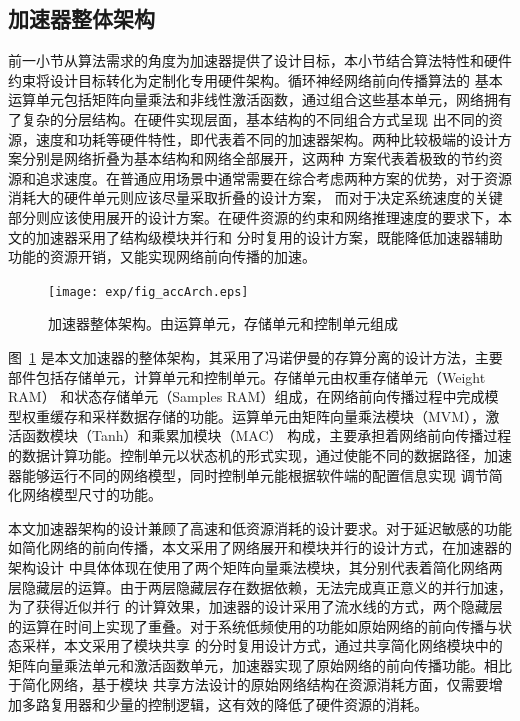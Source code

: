 \subsection{加速器整体架构}
前一小节从算法需求的角度为加速器提供了设计目标，本小节结合算法特性和硬件约束将设计目标转化为定制化专用硬件架构。循环神经网络前向传播算法的
基本运算单元包括矩阵向量乘法和非线性激活函数，通过组合这些基本单元，网络拥有了复杂的分层结构。在硬件实现层面，基本结构的不同组合方式呈现
出不同的资源，速度和功耗等硬件特性，即代表着不同的加速器架构。两种比较极端的设计方案分别是网络折叠为基本结构和网络全部展开，这两种
方案代表着极致的节约资源和追求速度。在普通应用场景中通常需要在综合考虑两种方案的优势，对于资源消耗大的硬件单元则应该尽量采取折叠的设计方案，
而对于决定系统速度的关键部分则应该使用展开的设计方案。在硬件资源的约束和网络推理速度的要求下，本文的加速器采用了结构级模块并行和
分时复用的设计方案，既能降低加速器辅助功能的资源开销，又能实现网络前向传播的加速。
\begin{figure}
	\centering
	\texttt{[image: exp/fig\_accArch.eps]}
	\caption{加速器整体架构。由运算单元，存储单元和控制单元组成}
	\label{fig:accArch}
\end{figure}

图~\ref{fig:accArch} 是本文加速器的整体架构，其采用了冯诺伊曼的存算分离的设计方法，主要部件包括存储单元，计算单元和控制单元。存储单元由权重存储单元（Weight RAM）
和状态存储单元（Samples RAM）组成，在网络前向传播过程中完成模型权重缓存和采样数据存储的功能。运算单元由矩阵向量乘法模块（MVM），激活函数模块（Tanh）和乘累加模块（MAC）
构成，主要承担着网络前向传播过程的数据计算功能。控制单元以状态机的形式实现，通过使能不同的数据路径，加速器能够运行不同的网络模型，同时控制单元能根据软件端的配置信息实现
调节简化网络模型尺寸的功能。

本文加速器架构的设计兼顾了高速和低资源消耗的设计要求。对于延迟敏感的功能如简化网络的前向传播，本文采用了网络展开和模块并行的设计方式，在加速器的架构设计
中具体体现在使用了两个矩阵向量乘法模块，其分别代表着简化网络两层隐藏层的运算。由于两层隐藏层存在数据依赖，无法完成真正意义的并行加速，为了获得近似并行
的计算效果，加速器的设计采用了流水线的方式，两个隐藏层的运算在时间上实现了重叠。对于系统低频使用的功能如原始网络的前向传播与状态采样，本文采用了模块共享
的分时复用设计方式，通过共享简化网络模块中的矩阵向量乘法单元和激活函数单元，加速器实现了原始网络的前向传播功能。相比于简化网络，基于模块
共享方法设计的原始网络结构在资源消耗方面，仅需要增加多路复用器和少量的控制逻辑，这有效的降低了硬件资源的消耗。



